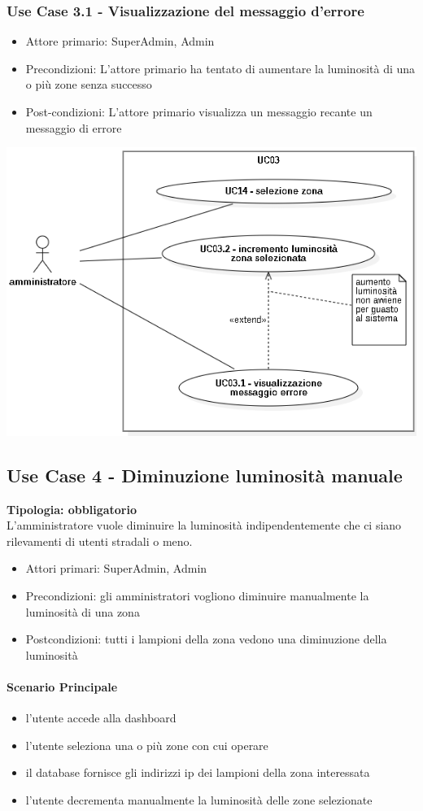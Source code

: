 \documentclass[12pt]{article}
\begin{document}
\subsubsection{Use Case 3.1 - Visualizzazione del messaggio d'errore}
\begin{itemize}
	\item Attore primario: SuperAdmin, Admin
	\item Precondizioni: L'attore primario ha tentato di aumentare la luminosità di una o più zone senza successo
	\item Post-condizioni: L'attore primario visualizza un messaggio recante un messaggio di errore
\end{itemize}

\includegraphics[scale=0.5]{UC03.png}

\subsection{Use Case 4 - Diminuzione luminosità manuale}
\textbf{Tipologia: obbligatorio} \\
L'amministratore vuole diminuire la luminosità indipendentemente che ci siano rilevamenti di utenti stradali o meno.
\begin{itemize}
	\item Attori primari: SuperAdmin, Admin
	\item Precondizioni: gli amministratori vogliono diminuire manualmente la luminosità di una zona
	\item Postcondizioni: tutti i lampioni della zona vedono una diminuzione della luminosità
\end{itemize}
\paragraph{Scenario Principale}
\begin{itemize}
	\item l'utente accede alla dashboard
	\item l'utente seleziona una o più zone con cui operare
 	\item il database fornisce gli indirizzi ip dei lampioni della zona interessata
	\item l'utente decrementa manualmente la luminosità delle zone selezionate
\end{itemize}
\end{document}

